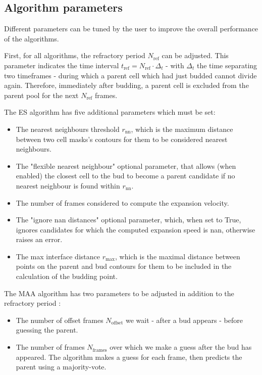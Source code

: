 \documentclass{TP}
\begin{document}
\subsection{Algorithm parameters}
\label{algo param}

Different parameters can be tuned by the user to improve the overall performance of the algorithms.

First, for all algorithms, the refractory period $N_{\text{ref}}$ can be adjusted. This parameter indicates the time interval $t_{\text{ref}} = N_{\text{ref}} \cdot \Delta_t$  - with $\Delta_t$ the time separating two timeframes - during which a parent cell which had just budded cannot divide again. Therefore, immediately after budding, a parent cell is excluded from the parent pool for the next $N_{\text{ref}}$ frames.

The ES algorithm has five additional parameters which must be set: 
\begin{itemize}
\setlength\itemsep{0.0em}
\item The nearest neighbours threshold $r_{\text{nn}}$, which is the maximum distance between two cell masks's contours for them to be considered nearest neighbours. 
\item The "flexible nearest neighbour" optional parameter, that allows (when enabled) the closest cell to the bud to become a parent candidate if no nearest neighbour is found within $r_{\text{nn}}$.
\item The number of frames considered to compute the expansion velocity.
\item The "ignore nan distances" optional parameter, which, when set to True, ignores candidates for which the computed expansion speed is nan, otherwise raises an error. 
\item The max interface distance $r_{\text{max}}$, which is the maximal distance between points on the parent and bud contours for them to be included in the calculation of the budding point.
\end{itemize}

The MAA algorithm has two parameters to be adjusted in addition to the refractory period : 
\begin{itemize}
\setlength\itemsep{0.0em}
    \item The number of offset frames $N_{\text{offset}}$ we wait - after a bud appears - before guessing the parent.
    \item The number of frames $N_{\text{frames}}$ over which we make a guess after the bud has appeared. The algorithm makes a guess for each frame, then predicts the parent using a majority-vote.
\end{itemize}
\end{document}
